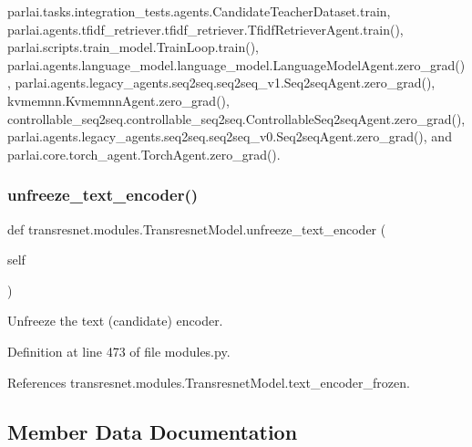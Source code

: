 parlai.\+tasks.\+integration\+\_\+tests.\+agents.\+Candidate\+Teacher\+Dataset.\+train, parlai.\+agents.\+tfidf\+\_\+retriever.\+tfidf\+\_\+retriever.\+Tfidf\+Retriever\+Agent.\+train(), parlai.\+scripts.\+train\+\_\+model.\+Train\+Loop.\+train(), parlai.\+agents.\+language\+\_\+model.\+language\+\_\+model.\+Language\+Model\+Agent.\+zero\+\_\+grad(), parlai.\+agents.\+legacy\+\_\+agents.\+seq2seq.\+seq2seq\+\_\+v1.\+Seq2seq\+Agent.\+zero\+\_\+grad(), kvmemnn.\+Kvmemnn\+Agent.\+zero\+\_\+grad(), controllable\+\_\+seq2seq.\+controllable\+\_\+seq2seq.\+Controllable\+Seq2seq\+Agent.\+zero\+\_\+grad(), parlai.\+agents.\+legacy\+\_\+agents.\+seq2seq.\+seq2seq\+\_\+v0.\+Seq2seq\+Agent.\+zero\+\_\+grad(), and parlai.\+core.\+torch\+\_\+agent.\+Torch\+Agent.\+zero\+\_\+grad().

\mbox{\label{classtransresnet_1_1modules_1_1TransresnetModel_af09f30a28796ae02eaa8b6cf39bcf2d1}} 
\subsubsection{\texorpdfstring{unfreeze\+\_\+text\+\_\+encoder()}{unfreeze\_text\_encoder()}}
{\footnotesize\ttfamily def transresnet.\+modules.\+Transresnet\+Model.\+unfreeze\+\_\+text\+\_\+encoder (\begin{DoxyParamCaption}\item[{}]{self }\end{DoxyParamCaption})}

\begin{DoxyVerb}Unfreeze the text (candidate) encoder.\end{DoxyVerb}
 

Definition at line 473 of file modules.\+py.



References transresnet.\+modules.\+Transresnet\+Model.\+text\+\_\+encoder\+\_\+frozen.



\subsection{Member Data Documentation}
\mbox{\label{classtransresnet_1_1modules_1_1TransresnetModel_a42cc931560cfffa5765b6f3327f1003e}} 
